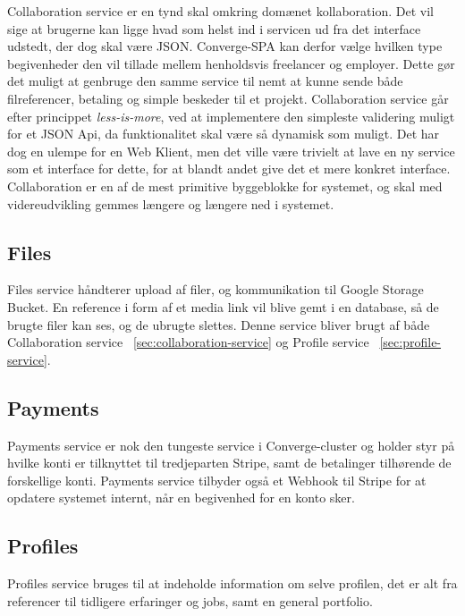Collaboration service er en tynd skal omkring domænet kollaboration. Det vil sige at brugerne kan ligge hvad som helst ind i servicen ud fra det interface udstedt, der dog skal være JSON. Converge-SPA kan derfor vælge hvilken type begivenheder den vil tillade mellem henholdsvis freelancer og employer. Dette gør det muligt at genbruge den samme service til nemt at kunne sende både filreferencer, betaling og simple beskeder til et projekt. Collaboration service går efter princippet \emph{less-is-more}, ved at implementere den simpleste validering muligt for et JSON Api, da funktionalitet skal være så dynamisk som muligt. Det har dog en ulempe for en Web Klient, men det ville være trivielt at lave en ny service som et interface for dette, for at blandt andet give det et mere konkret interface. Collaboration er en af de mest primitive byggeblokke for systemet, og skal med videreudvikling gemmes længere og længere ned i systemet.

\subsection{Files}
\label{sec:files-service}

Files service håndterer upload af filer, og kommunikation til Google Storage Bucket. En reference i form af et media link vil blive gemt i en database, så de brugte filer kan ses, og de ubrugte slettes. Denne service bliver brugt af både Collaboration  service  ~\ref{sec:collaboration-service} og Profile service ~\ref{sec:profile-service}.

\subsection{Payments}
\label{sec:payments-service}

Payments service er nok den tungeste service i Converge-cluster og holder styr på hvilke konti er tilknyttet til tredjeparten Stripe, samt de betalinger tilhørende de forskellige konti. Payments service tilbyder også et Webhook til Stripe for at opdatere systemet internt, når en begivenhed for en konto sker.

\subsection{Profiles}
\label{sec:profiles-service}

Profiles service bruges til at indeholde information om selve profilen, det er alt fra referencer til tidligere erfaringer og jobs, samt en general portfolio.

